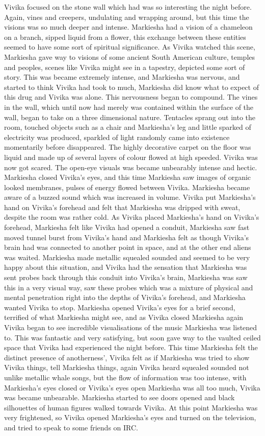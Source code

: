 \documentclass[12pt]{book}
\begin{document}
Vivika focused on the stone wall which had was so interesting the night before. Again, vines and creepers, undulating and wrapping around, but this time the visions was so much deeper and intense. Markiesha had a vision of a chameleon on a branch, sipped liquid from a flower, this exchange between these entities seemed to have some sort of spiritual significance. As Vivika watched this scene, Markiesha gave way to visions of some ancient South American culture, temples and peoples, scenes like Vivika might see in a tapestry, depicted some sort of story. This was became extremely intense, and Markiesha was nervous, and started to think Vivika had took to much, Markiesha did know what to expect of this drug and Vivika was alone. This nervousness began to compound. The vines in the wall, which until now had merely was contained within the surface of the wall, began to take on a three dimensional nature. Tentacles sprang out into the room, touched objects such as a chair and Markiesha's leg and little sparked of electricity was produced, sparkled of light randomly came into existence momentarily before disappeared. The highly decorative carpet on the floor was liquid and made up of several layers of colour flowed at high speeded. Vivika was now got scared. The open-eye visuals was became unbearably intense and hectic. Markiesha closed Vivika's eyes, and this time Markiesha saw images of organic looked membranes, pulses of energy flowed between Vivika. Markiesha became aware of a buzzed sound which was increased in volume. Vivika put Markiesha's hand on Vivika's forehead and felt that Markiesha was dripped with sweat, despite the room was rather cold. As Vivika placed Markiesha's hand on Vivika's forehead, Markiesha felt like Vivika had opened a conduit, Markiesha saw fast moved tunnel burst from Vivika's hand and Markiesha felt as though Vivika's brain had was connected to another point in space, and at the other end aliens was waited. Markiesha made metallic squealed sounded and seemed to be very happy about this situation, and Vivika had the sensation that Markiesha was sent probes back through this conduit into Vivika's brain, Markiesha was saw this in a very visual way, saw these probes which was a mixture of physical and mental penetration right into the depths of Vivika's forehead, and Markiesha wanted Vivika to stop. Markiesha opened Vivika's eyes for a brief second, terrified of what Markiesha might see, and as Vivika closed Markiesha again Vivika began to see incredible visualisations of the music Markiesha was listened to. This was fantastic and very satisfying, but soon gave way to the vaulted ceiled space that Vivika had experienced the night before. This time Markiesha felt the distinct presence of anotherness', Vivika felt as if Markiesha was tried to show Vivika things, tell Markiesha things, again Vivika heard squealed sounded not unlike metallic whale songs, but the flow of information was too intense, with Markiesha's eyes closed or Vivika's eyes open Markiesha was all too much, Vivika was became unbearable. Markiesha started to see doors opened and black silhouettes of human figures walked towards Vivika. At this point Markiesha was very frightened, so Vivika opened Markiesha's eyes and turned on the television, and tried to speak to some friends on IRC. 
\end{document}
